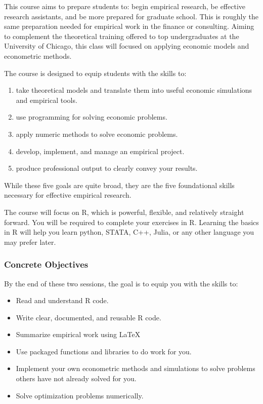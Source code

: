 \documentclass{scrartcl}
\begin{document}
This course aims to prepare students to: begin empirical research, be effective research assistants, and be more prepared for graduate school. This is roughly the same preparation needed for empirical work in the finance or consulting. Aiming to complement the theoretical training offered to top undergraduates at the University of Chicago, this class will focused on applying economic models and econometric methods. 



The course is designed to equip students with the skills to:
\begin{enumerate}
\item take theoretical models and translate them into useful economic simulations and empirical tools.
\item use programming for solving economic problems.
\item apply numeric methods to solve economic problems.
\item develop, implement, and manage an empirical project.
\item produce professional output to clearly convey your results.
\end{enumerate}
While these five goals are quite broad, they are the five foundational skills necessary for effective empirical research. 

The course will focus on R, which is powerful, flexible, and relatively straight forward. You will be required to complete your exercises in R. Learning the basics in R will help you learn python, STATA, C++, Julia, or any other language you may prefer later.

\subsubsection*{Concrete Objectives}



By the end of these two sessions, the goal is to equip you with the skills to:
\begin{itemize}
\item Read and understand R code.
\item Write clear, documented, and reusable R code.
\item Summarize empirical work using \LaTeX
\item Use packaged functions and libraries to do work for you.
\item Implement your own econometric methods and simulations to solve problems others have not already solved for you.
\item Solve optimization problems numerically. 
\end{itemize}
\end{document}
